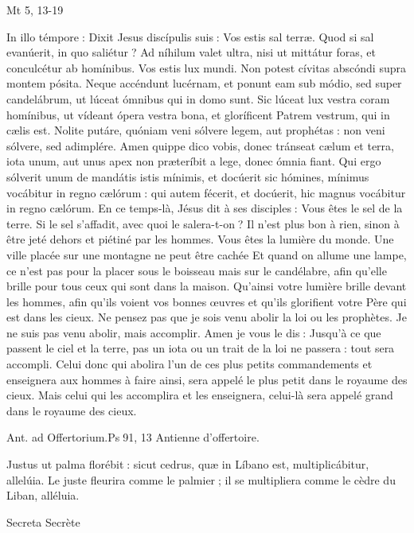 \begin{paracol}{2}
Mt 5, 13-19
\switchcolumn

\switchcolumn*

In illo témpore : Dixit Jesus discípulis  suis : Vos estis sal terræ. Quod si sal evanúerit, in quo saliétur ? Ad níhilum valet ultra, nisi ut mittátur foras, et conculcétur ab homínibus. Vos estis lux mundi. Non potest cívitas abscóndi supra montem pósita. Neque accéndunt lucérnam, et ponunt eam sub módio, sed super candelábrum, ut lúceat ómnibus qui in domo sunt. Sic lúceat lux vestra coram homínibus, ut vídeant ópera vestra bona, et gloríficent Patrem vestrum, qui in cælis est. Nolite putáre, quóniam veni sólvere legem, aut prophétas : non veni sólvere, sed adimplére. Amen quippe dico vobis, donec tránseat cælum et terra, iota unum, aut unus apex non præteríbit a lege, donec ómnia fiant. Qui ergo sólverit unum de mandátis istis mínimis, et docúerit sic hómines, mínimus vocábitur in regno cælórum : qui autem fécerit, et docúerit, hic magnus vocábitur in regno cælórum.
\switchcolumn
En ce temps-là, Jésus dit à ses disciples :  Vous êtes le sel de la terre. Si le sel s’affadit, avec quoi le salera-t-on ? Il n’est plus bon à rien, sinon à être jeté dehors et piétiné par les hommes. Vous êtes la lumière du monde. Une ville placée sur une montagne ne peut être cachée Et quand on allume une lampe, ce n’est pas pour la placer sous le boisseau mais sur le candélabre, afin qu’elle brille pour tous ceux qui sont dans la maison. Qu’ainsi votre lumière brille devant les hommes, afin qu’ils voient vos bonnes œuvres et qu’ils glorifient votre Père qui est dans les cieux. Ne pensez pas que je sois venu abolir la loi ou les prophètes. Je ne suis pas venu abolir, mais accomplir. Amen je vous le dis : Jusqu’à ce que passent le ciel et la terre, pas un iota ou un trait de la loi ne passera : tout sera accompli. Celui donc qui abolira l’un de ces plus petits commandements et enseignera aux hommes à faire ainsi, sera appelé le plus petit dans le royaume des cieux. Mais celui qui les accomplira et les enseignera, celui-là sera appelé grand dans le royaume des cieux.
\switchcolumn*

Ant. ad Offertorium.\hfill Ps 91, 13
\switchcolumn
Antienne d’offertoire.
\switchcolumn*

Justus ut palma florébit : sicut cedrus, quæ in Líbano est, multiplicábitur, allelúia.
\switchcolumn
Le juste fleurira comme le palmier ; il se multipliera comme le cèdre du Liban, alléluia.
\switchcolumn*

Secreta
\switchcolumn
Secrète
\switchcolumn*


\end{paracol}
